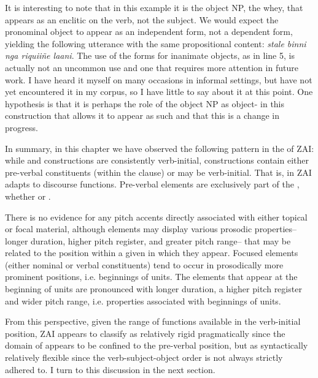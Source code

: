 It is interesting to note that in this example it is the object NP, the whey, that appears as an enclitic on the verb, not the subject. We would expect the pronominal object to appear as an independent form, not a dependent form, yielding the following utterance with the same propositional content: \textit{stale binni nga riquii\~{n}e laani}. The use of the  forms for inanimate objects, as in line 5, is actually not an uncommon use and one that requires more attention in future work. I have heard it myself on many occasions in informal settings, but have not yet encountered it in my corpus, so I have little to say about it at this point. One hypothesis is that it is perhaps the role of the object NP as object- in this construction that allows it to appear as such and that this is a change in progress. 

In summary, in this chapter we have observed the following pattern in the  of ZAI: while  and  constructions are consistently verb-initial,  constructions contain either pre-verbal constituents (within the clause) or may be verb-initial. That is,  in ZAI adapts to discourse functions. Pre-verbal elements are exclusively part of the , whether  or .

There is no evidence for any pitch accents directly associated with either topical or focal material, although elements may display various prosodic properties-- longer duration, higher pitch register, and greater pitch range-- that may be related to the position within a given  in which they appear. Focused elements (either nominal or verbal constituents) tend to occur in prosodically more prominent positions, i.e. beginnings of  units. The elements that appear at the beginning of  units are pronounced with longer duration, a higher pitch register and wider pitch range, i.e. properties associated with beginnings of  units.

From this perspective, given the range of functions available in the verb-initial position, ZAI appears to classify as relatively rigid pragmatically since the domain of  appears to be confined to the pre-verbal position, but as syntactically relatively flexible since the verb-subject-object order is not always strictly adhered to. I turn to this discussion in the next section.


